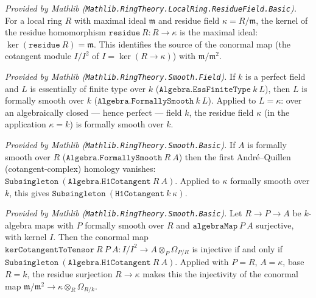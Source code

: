 \begin{lemma}
  \label{lem:ker_residue_mathlib}
  \mathlibok
  \textit{Provided by Mathlib
  (\texttt{Mathlib.RingTheory.LocalRing.ResidueField.Basic}).}
  For a local ring \(R\) with maximal ideal \(\mathfrak m\) and residue field
  \(\kappa = R/\mathfrak m\), the kernel of the residue homomorphism
  \(\texttt{residue}\ R : R \to \kappa\) is the maximal ideal:
  \(\operatorname{ker}(\texttt{residue}\ R) = \mathfrak m\). This identifies
  the source of the conormal map (the cotangent module
  \(I/I^2\) of \(I = \operatorname{ker}(R \to \kappa)\)) with
  \(\mathfrak m/\mathfrak m^2\).
\end{lemma}

\begin{lemma}
  \label{lem:formallySmooth_of_perfectField_mathlib}
  \mathlibok
  \textit{Provided by Mathlib
  (\texttt{Mathlib.RingTheory.Smooth.Field}).}
  If \(k\) is a perfect field and \(L\) is essentially of finite type over
  \(k\) (\(\texttt{Algebra.EssFiniteType}\ k\ L\)), then \(L\) is formally
  smooth over \(k\) (\(\texttt{Algebra.FormallySmooth}\ k\ L\)). Applied to
  \(L = \kappa\): over an algebraically closed --- hence perfect --- field
  \(k\), the residue field \(\kappa\) (in the application \(\kappa = k\)) is
  formally smooth over \(k\).
\end{lemma}

\begin{lemma}
  \label{lem:subsingleton_h1Cotangent_mathlib}
  \mathlibok
  \textit{Provided by Mathlib
  (\texttt{Mathlib.RingTheory.Smooth.Basic}).}
  If \(A\) is formally smooth over \(R\)
  (\(\texttt{Algebra.FormallySmooth}\ R\ A\)) then the first Andr\'e--Quillen
  (cotangent-complex) homology vanishes:
  \(\texttt{Subsingleton}\ (\texttt{Algebra.H1Cotangent}\ R\ A)\). Applied to
  \(\kappa\) formally smooth over \(k\), this gives
  \(\texttt{Subsingleton}\ (\texttt{H1Cotangent}\ k\ \kappa)\).
\end{lemma}

\begin{lemma}
  \label{lem:kerCotangentToTensor_injective_iff_mathlib}
  \mathlibok
  \textit{Provided by Mathlib
  (\texttt{Mathlib.RingTheory.Smooth.Basic}).}
  Let \(R \to P \to A\) be \(k\)-algebra maps with \(P\) formally smooth over
  \(R\) and \(\texttt{algebraMap}\ P\ A\) surjective, with kernel \(I\). Then
  the conormal map
  \(\texttt{kerCotangentToTensor}\ R\ P\ A : I/I^2 \to A \otimes_P
  \Omega_{P/R}\) is injective if and only if
  \(\texttt{Subsingleton}\ (\texttt{Algebra.H1Cotangent}\ R\ A)\). Applied
  with \(P = R\), \(A = \kappa\), base \(R = k\), the residue surjection
  \(R \to \kappa\) makes this the injectivity of the conormal map
  \(\mathfrak m/\mathfrak m^2 \to \kappa \otimes_R \Omega_{R/k}\).
\end{lemma}

